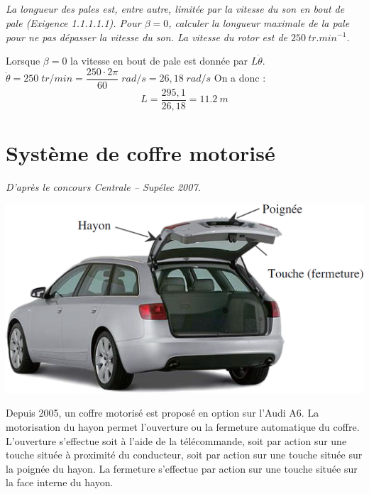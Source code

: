 \documentclass[10pt,fleqn]{article} %
\begin{document}
\begin{multicols}{2}
\begin{multicols}{2}
\subparagraph{}
\textit{La longueur des pales est, entre autre, limitée par la vitesse du son en bout de pale (Exigence 1.1.1.1.1). Pour $\beta=0$, calculer la longueur maximale de la pale pour ne pas dépasser la vitesse du son. La vitesse du rotor est de $\SI{250}{tr.min^{-1}}$.}
\ifprof
\begin{corrige}
Lorsque $\beta=0$ la vitesse en bout de pale est donnée par $L\dot{\theta}$.
$\dot{\theta}=250 \; tr/min = \dfrac{250 \cdot 2 \pi}{60}\;rad/s = 26,18\;rad/s$
On a donc :
$$
L = \dfrac{295,1}{26,18} =\SI{11,2}{m}
$$
\end{corrige}\else \fi

\section*{Système de coffre motorisé}
\setcounter{subparagraph}{0}
\begin{flushleft}
\textit{D'après le concours Centrale -- Supélec 2007.}
\end{flushleft}
\ifprof
\else

\begin{center}
\includegraphics[width=.7\linewidth]{images/A6_coffre}
\end{center}

Depuis 2005, un coffre motorisé est proposé en option sur l’Audi A6. La motorisation du hayon permet l’ouverture ou la fermeture automatique du coffre. L’ouverture s’effectue soit à l’aide de la télécommande, soit par action sur une touche située à proximité du conducteur, soit par action sur une touche située sur la poignée du hayon. La fermeture s’effectue par action sur une touche située sur la face interne du hayon.




\end{multicols}
\end{multicols}
\end{document}
